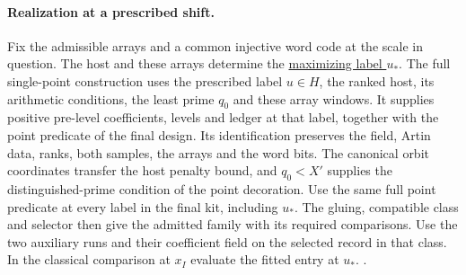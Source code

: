 \paragraph{Realization at a prescribed shift.}
%
Fix the admissible arrays and a common injective word code at the
scale in question. The host and these arrays determine the
\hyperlink{proof.classical-maximizing-translate}{maximizing label \(u_*\)}.
The full single-point construction uses the prescribed label
\(u\in H\), the ranked host, its arithmetic conditions, the least
prime \(q_0\) and these array windows. It supplies positive pre-level
coefficients, levels and ledger at that label, together with the
point predicate of the final design. Its identification preserves
the field, Artin data, ranks, both samples, the arrays and the word
bits. The canonical orbit coordinates transfer the host penalty
bound, and \(q_0<X'\) supplies the distinguished-prime condition
of the point decoration. Use the same full point predicate
at every label in the final kit, including \(u_*\). The gluing,
compatible class and selector then give the admitted family with
its required comparisons. Use the two auxiliary runs and their
coefficient field on the selected record in that class. In the
classical comparison at \(x_I\) evaluate the fitted entry at \(u_*\).
.


